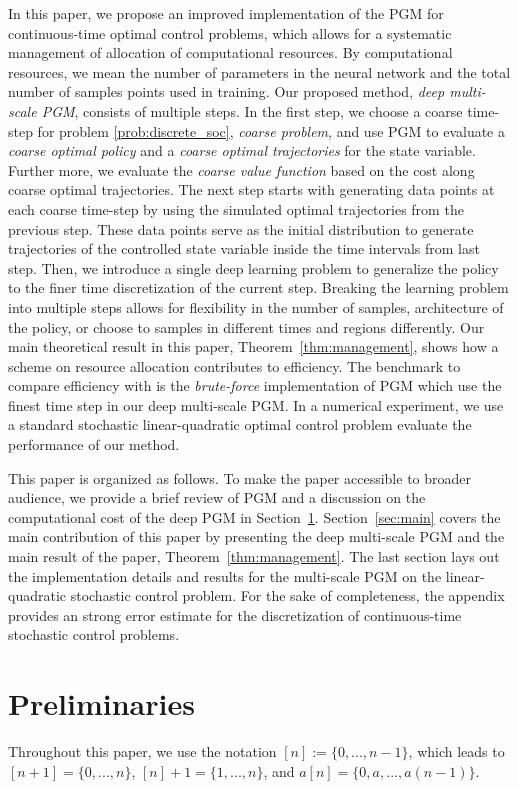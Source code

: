 \documentclass{article}
\numberwithin{equation}{section}
\begin{document}
In this paper, we propose an improved implementation of the PGM for continuous-time optimal control problems, which allows for a systematic management of allocation of computational resources. By computational resources, we mean the number of parameters in the neural network and the total number of samples points used in training. Our proposed method, \emph{deep multi-scale PGM}, consists of multiple steps. In the first step, we choose a coarse time-step for problem \eqref{prob:discrete_soc}, \emph{coarse problem}, and use PGM to evaluate a \emph{coarse optimal policy} and a \emph{coarse optimal trajectories} for the state variable. Further more, we evaluate the \emph{coarse value function} based on the cost along coarse optimal trajectories. The next step starts with generating data points at each coarse time-step by using the simulated optimal trajectories from the previous step. These data points serve as the initial distribution to generate trajectories of the controlled state variable inside the time intervals from last step. Then, we introduce a single deep learning problem to generalize the policy to the finer time discretization of the current step. Breaking the learning problem into multiple steps allows for flexibility in the number of samples, architecture of the policy, or choose to samples in different times and regions differently.  Our main theoretical result in this paper, Theorem~\ref{thm:management}, shows how a scheme on resource allocation contributes to efficiency. The benchmark to compare efficiency with is the \emph{brute-force} implementation of PGM which use the finest time step in our deep multi-scale PGM. In a numerical experiment, we use a standard stochastic linear-quadratic optimal control problem evaluate the performance of our method.

This paper is organized as follows. To make the paper accessible to broader audience, we provide a brief review of PGM and a discussion on the computational cost of the deep PGM in Section~\ref{sec:prelim}. Section~\ref{sec:main} covers the main contribution of this paper by presenting the deep multi-scale PGM and the main result of the paper, Theorem~\ref{thm:management}. The last section lays out the implementation details and results for the multi-scale PGM on the linear-quadratic stochastic control problem. For the sake of completeness, the appendix provides an strong error estimate for the discretization of continuous-time stochastic control problems. 
\section{Preliminaries}
\label{sec:prelim}
Throughout this paper, we use the notation $[n]:= \{0,...,n-1\}$, which leads to $[n+1]=\{0,...,n\}$, $[n]+1=\{1,...,n\}$, and $a[n]=\{0,a,...,a(n-1)\}$.
\end{document}
